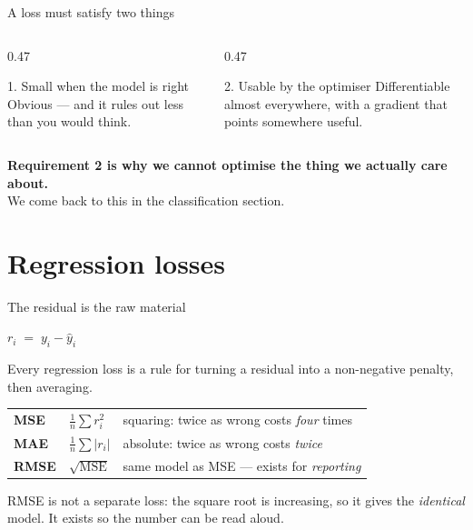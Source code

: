 \documentclass[aspectratio=169]{beamer}
\begin{document}
\begin{frame}{A loss must satisfy two things}
  \begin{columns}[T]
    \begin{column}{0.47\textwidth}
      \begin{block}{1. Small when the model is right}
        Obvious --- and it rules out less than you would think.
      \end{block}
    \end{column}
    \begin{column}{0.47\textwidth}
      \begin{block}{2. Usable by the optimiser}
        Differentiable almost everywhere, with a gradient that points
        somewhere useful.
      \end{block}
    \end{column}
  \end{columns}
  \vspace{1em}
  \begin{center}
    \textbf{Requirement 2 is why we cannot optimise the thing we actually
    care about.}\\[0.3em]
    \small We come back to this in the classification section.
  \end{center}
\end{frame}

\section{Regression losses}
\label{sec:reg}

\begin{frame}{The residual is the raw material}
  \begin{center}
    \Large $r_i \;=\; y_i - \hat{y}_i$
  \end{center}
  \vspace{0.6em}
  Every regression loss is a rule for turning a residual into a non-negative
  penalty, then averaging.
  \vspace{0.8em}
  \begin{center}
  \begin{tabular}{@{}lll@{}}
    \toprule
    \textbf{MSE}  & $\frac{1}{n}\sum r_i^2$          & squaring: twice as wrong costs \emph{four} times\\[3pt]
    \textbf{MAE}  & $\frac{1}{n}\sum |r_i|$          & absolute: twice as wrong costs \emph{twice}\\[3pt]
    \textbf{RMSE} & $\sqrt{\mathrm{MSE}}$            & same model as MSE --- exists for \emph{reporting}\\
    \bottomrule
  \end{tabular}
  \end{center}
  \vspace{0.4em}
  \begin{center}\small
    RMSE is not a separate loss: the square root is increasing, so it gives the
    \emph{identical} model. It exists so the number can be read aloud.
  \end{center}
\end{frame}
\end{document}
